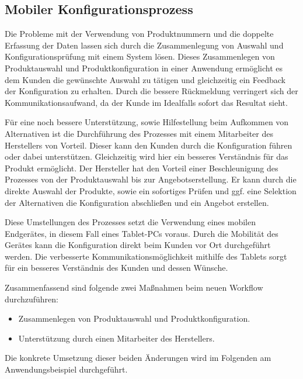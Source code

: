\subsection{Mobiler Konfigurationsprozess}\label{mobileConfiguration}
Die Probleme mit der Verwendung von Produktnummern und die doppelte Erfassung der Daten lassen sich durch die Zusammenlegung von Auswahl und Konfigurationsprüfung mit einem System lösen. Dieses Zusammenlegen von Produktauswahl und Produktkonfiguration in einer Anwendung ermöglicht es dem Kunden die gewünschte Auswahl zu tätigen und gleichzeitig ein Feedback der Konfiguration zu erhalten. Durch die bessere Rückmeldung verringert sich der Kommunikationsaufwand, da der Kunde im Idealfalls sofort das Resultat sieht. \par 
 Für eine noch bessere Unterstützung, sowie Hilfestellung beim Aufkommen von Alternativen ist die Durchführung des Prozesses mit einem Mitarbeiter des Herstellers von Vorteil. Dieser kann den Kunden durch die Konfiguration führen oder dabei unterstützen. Gleichzeitig wird hier ein besseres Verständnis für das Produkt ermöglicht. Der Hersteller hat den Vorteil einer Beschleunigung des Prozesses von der Produktauswahl bis zur Angebotserstellung. Er kann durch die direkte Auswahl der Produkte, sowie ein sofortiges Prüfen und ggf. eine Selektion der Alternativen die Konfiguration abschließen und ein  Angebot erstellen. \par 
 
Diese Umstellungen des Prozesses setzt die Verwendung eines mobilen Endgerätes, in diesem Fall eines Tablet-PCs voraus. Durch die Mobilität des Gerätes kann die Konfiguration direkt beim Kunden vor Ort durchgeführt werden. Die verbesserte Kommunikationsmöglichkeit mithilfe des Tablets sorgt für ein besseres Verständnis des Kunden und dessen Wünsche. 


Zusammenfassend sind folgende zwei Maßnahmen beim neuen Workflow durchzuführen: \par

\begin{itemize}
        \item Zusammenlegen von Produktauswahl und Produktkonfiguration. 
        \item Unterstützung durch einen Mitarbeiter des Herstellers.
\end{itemize}
Die konkrete Umsetzung dieser beiden Änderungen wird im Folgenden am Anwendungsbeispiel durchgeführt. \par

